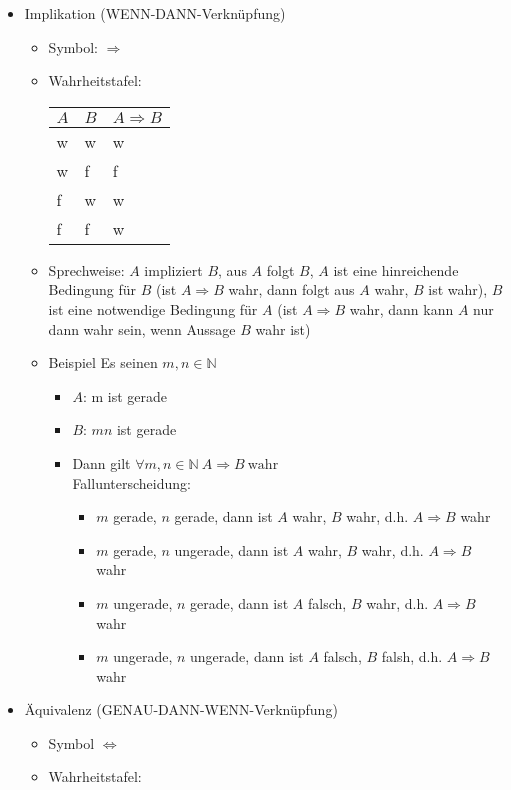 \documentclass[a4paper]{scrartcl}
\DeclareMathOperator{\Forall}{\forall}
\theoremstyle{definition}
\theoremstyle{plain}
\theoremstyle{plain}
\theoremstyle{remark}
\theoremstyle{remark}
\theoremstyle{remark}
\begin{document}
\begin{itemize}
\item Implikation (WENN-DANN-Verknüpfung)
\begin{itemize}
\item Symbol: $\Rightarrow$
\item Wahrheitstafel:
\begin{center}
\begin{tabular}{lll}
$A$ & $B$ & $A\Rightarrow B$\\
\hline
w & w & w\\
w & f & f\\
f & w & w\\
f & f & w\\
\end{tabular}
\end{center}
\item Sprechweise: $A$ impliziert $B$, aus $A$ folgt $B$, $A$ ist eine hinreichende Bedingung für $B$ (ist $A\Rightarrow B$ wahr, dann folgt aus $A$ wahr, $B$ ist wahr), $B$ ist eine notwendige Bedingung für $A$ (ist $A\Rightarrow B$ wahr, dann kann $A$ nur dann wahr sein, wenn Aussage $B$ wahr ist)
\item Beispiel Es seinen $m,n\in\mathbb{N}$
\begin{itemize}
\item $A$: m ist gerade
\item $B$: $mn$ ist gerade
\item Dann gilt $\Forall m,n \in\mathbb{N}~A\Rightarrow B~\text{wahr}$ \\
         Fallunterscheidung:
\begin{itemize}
\item $m$ gerade, $n$ gerade, dann ist $A$ wahr, $B$ wahr, d.h. $A\Rightarrow B$ wahr
\item $m$ gerade, $n$ ungerade, dann ist $A$ wahr, $B$ wahr, d.h. $A\Rightarrow B$ wahr
\item $m$ ungerade, $n$ gerade, dann ist $A$ falsch, $B$ wahr, d.h. $A\Rightarrow B$ wahr
\item $m$ ungerade, $n$ ungerade, dann ist $A$ falsch, $B$ falsh, d.h. $A\Rightarrow B$ wahr
\end{itemize}
\end{itemize}
\end{itemize}
\item Äquivalenz (GENAU-DANN-WENN-Verknüpfung)
\begin{itemize}
\item Symbol $\Leftrightarrow$
\item Wahrheitstafel:
\begin{center}

\end{center}
\end{itemize}
\end{itemize}
\end{document}

